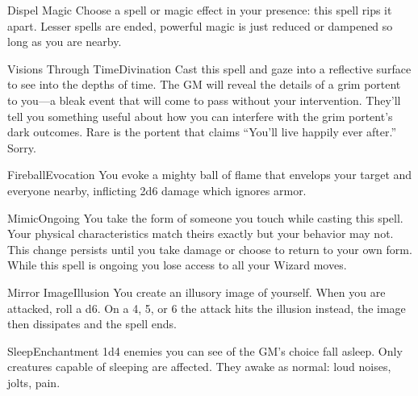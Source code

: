 \documentclass[8pt]{extarticle}
\begin{document}
\begin{multicols}{2}

  \begin{aspell}{Dispel Magic}{}
    Choose a spell or magic effect in your presence: this spell rips
    it apart. Lesser spells are ended, powerful magic is just reduced
    or dampened so long as you are nearby.
  \end{aspell}

  \begin{aspell}{Visions Through Time}{Divination}
    Cast this spell and gaze into a reflective surface to see into the
    depths of time. The GM will reveal the details of a grim portent
    to you—a bleak event that will come to pass without your
    intervention. They’ll tell you something useful about how you can
    interfere with the grim portent’s dark outcomes. Rare is the
    portent that claims “You’ll live happily ever after.” Sorry.
  \end{aspell}

  \begin{aspell}{Fireball}{Evocation}
    You evoke a mighty ball of flame that envelops your target and
    everyone nearby, inflicting 2d6 damage which ignores armor.
  \end{aspell}

  \vfill\null
  \columnbreak

  \begin{aspell}{Mimic}{Ongoing}
    You take the form of someone you touch while casting this
    spell. Your physical characteristics match theirs exactly but your
    behavior may not. This change persists until you take damage or
    choose to return to your own form. While this spell is ongoing you
    lose access to all your Wizard moves.
  \end{aspell}

  \begin{aspell}{Mirror Image}{Illusion}
    You create an illusory image of yourself. When you are attacked,
    roll a d6. On a 4, 5, or 6 the attack hits the illusion instead,
    the image then dissipates and the spell ends.
  \end{aspell}

  \begin{aspell}{Sleep}{Enchantment}
    1d4 enemies you can see of the GM’s choice fall asleep. Only
    creatures capable of sleeping are affected. They awake as normal:
    loud noises, jolts, pain.
  \end{aspell}

\vfill\null
\end{multicols}
\end{document}
